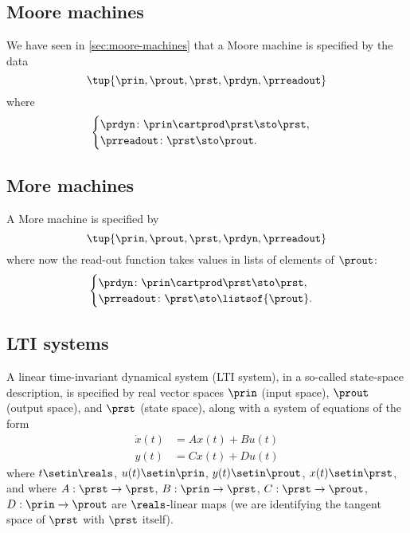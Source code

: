 \subsection{Moore machines}

We have seen in \cref{sec:moore-machines}  that a Moore machine is specified by the data
\begin{equation}
    \tup{\prin, \prout, \prst, \prdyn, \prreadout}
\end{equation}
where
\begin{equation}\label{eq:moore-specification-again}
    \begin{cases}
        \prdyn \colon \prin \cartprod \prst \sto \prst, \\
        \prreadout \colon \prst \sto \prout.
    \end{cases}
\end{equation}

\subsection{More machines}

A More machine is specified by
\begin{equation}
    \tup{\prin, \prout, \prst, \prdyn, \prreadout}
\end{equation}
where now the read-out function takes values in lists of elements of $\prout$:
\begin{equation}\label{eq:more-specification-again}
    \begin{cases}
        \prdyn \colon \prin \cartprod \prst \sto \prst, \\
        \prreadout \colon \prst \sto \listsof{\prout}.
    \end{cases}
\end{equation}

\subsection{LTI systems}

A linear time-invariant dynamical system (LTI system), in a so-called state-space description, is specified by real vector spaces $\prin$ (input space), $\prout$ (output space), and $\prst$ (state space), along with a system of equations of the form
\begin{align}
    \dot x(t) & = Ax(t) + Bu(t) \label{eq:LTI-system-dyn} \\
    y(t)      & = Cx(t) + Du(t) \label{eq:LTI-system-ro}
\end{align}
where $t \setin \reals$, $u(t) \setin \prin$, $y(t) \setin \prout$, $x(t) \setin \prst$, and where $A: \prst \to \prst$, $B: \prin \to \prst$, $C: \prst \to \prout$, $D: \prin \to \prout$ are $\reals$-linear maps (we are identifying the tangent space of $\prst$ with $\prst$ itself).

